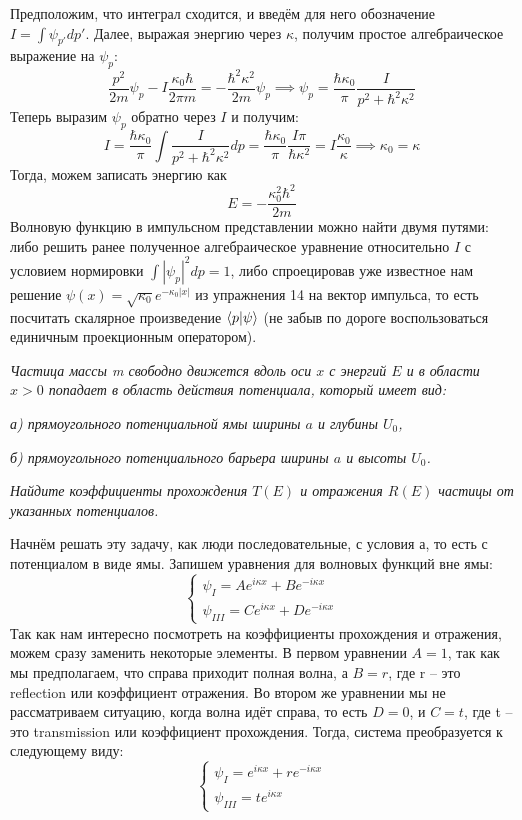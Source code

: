 Предположим, что интеграл сходится, и введём для него обозначение $I = \int \psi_{p'}dp'$. Далее, выражая энергию через $\kappa$, получим простое алгебраическое выражение на $\psi_p$:
\[
\frac{p^2}{2m}\psi_p - I\frac{\kappa_0\hbar}{2\pi m} = -\frac{\hbar^2\kappa^2}{2m}\psi_p \implies \psi_p = \frac{\hbar\kappa_0}{\pi}\frac{I}{p^2 + \hbar^2\kappa^2}
\]
Теперь выразим $\psi_p$ обратно через $I$ и получим:
\[
I = \frac{\hbar\kappa_0}{\pi}\int\frac{I}{p^2 + \hbar^2\kappa^2}dp = \frac{\hbar \kappa_0}{\pi}\frac{I \pi}{\hbar\kappa^2} = I\frac{\kappa_0}{\kappa} \implies \kappa_0 = \kappa
\]
Тогда, можем записать энергию как 
\[
E = -\frac{\kappa^2_0\hbar^2}{2m}
\]
Волновую функцию в импульсном представлении можно найти двумя путями: либо решить ранее полученное алгебраическое уравнение относительно $I$ с условием нормировки $\int|\psi_p|^2dp = 1$, либо спроецировав уже известное нам решение $\psi(x) =\sqrt{\kappa_0}e^{-\kappa_0|x|}$ из упражнения 14 на вектор импульса, то есть посчитать скалярное произведение $\bra{p}\ket{\psi}$ (не забыв по дороге воспользоваться единичным проекционным оператором).
\begin{center}
    \textit{Частица массы m свободно движется вдоль оси $x$ с энергий $E$ и в области $x>0$ попадает в область действия потенциала, который имеет вид:}
    
    \textit{а) прямоугольного потенциальной ямы ширины $a$ и глубины $U_0$,}

    \textit{б) прямоугольного потенциального барьера ширины $a$ и высоты $U_0$.}
    
    \textit{Найдите коэффициенты прохождения $T(E)$ и отражения $R(E)$ частицы от указанных потенциалов.}
\end{center}

Начнём решать эту задачу, как люди последовательные, с условия а, то есть с потенциалом в виде ямы. Запишем уравнения для волновых функций вне ямы:
\[
\begin{cases}
\psi_I = Ae^{i\kappa x} + Be^{-i\kappa x} \\
\psi_{III} = Ce^{i\kappa x} + De^{-i\kappa x}
\end{cases}
\]
Так как нам интересно посмотреть на коэффициенты прохождения и отражения, можем сразу заменить некоторые элементы. В первом уравнении $A = 1$, так как мы предполагаем, что справа приходит полная волна, а $B = r$, где r -- это reflection или коэффициент отражения. Во втором же уравнении мы не рассматриваем ситуацию, когда волна идёт справа, то есть $D = 0$, и $C = t$, где t -- это transmission или коэффициент прохождения. Тогда, система преобразуется к следующему виду:
\[
\begin{cases}
\psi_I = e^{i\kappa x} + re^{-i\kappa x} \\
\psi_{III} = te^{i\kappa x}
\end{cases}
\]

